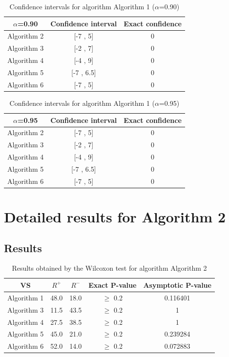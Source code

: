 \documentclass[a4paper,10pt]{article}
\begin{document}
\begin{table}[!htp]
\centering\small
\begin{tabular}{
|c|c|c|}
\hline
 $\alpha$=0.90 & Confidence interval & Exact confidence \\ \hline 
Algorithm 2 & [-7 , 5] & 0\\ \hline 
Algorithm 3 & [-2 , 7] & 0\\ \hline 
Algorithm 4 & [-4 , 9] & 0\\ \hline 
Algorithm 5 & [-7 , 6.5] & 0\\ \hline 
Algorithm 6 & [-7 , 5] & 0\\ \hline 

\end{tabular}
\caption{Confidence intervals for algorithm Algorithm 1 ($\alpha$=0.90)}
\end{table}
\begin{table}[!htp]
\centering\small
\begin{tabular}{
|c|c|c|}
\hline
 $\alpha$=0.95 & Confidence interval & Exact confidence \\ \hline 
Algorithm 2 & [-7 , 5] & 0\\ \hline 
Algorithm 3 & [-2 , 7] & 0\\ \hline 
Algorithm 4 & [-4 , 9] & 0\\ \hline 
Algorithm 5 & [-7 , 6.5] & 0\\ \hline 
Algorithm 6 & [-7 , 5] & 0\\ \hline 

\end{tabular}
\caption{Confidence intervals for algorithm Algorithm 1 ($\alpha$=0.95)}
\end{table}

 \clearpage 


\section{Detailed results for Algorithm 2}


\subsection{Results}

\begin{table}[!htp]
\centering\small
\begin{tabular}{
|c|c|c|c|c|}
\hline
 VS & $R^{+}$ & $R^{-}$ & Exact P-value & Asymptotic P-value \\ \hline 
Algorithm 1 & 48.0 & 18.0 & $\geq$ 0.2 & 0.116401\\ \hline 
Algorithm 3 & 11.5 & 43.5 & $\geq$ 0.2 & 1\\ \hline 
Algorithm 4 & 27.5 & 38.5 & $\geq$ 0.2 & 1\\ \hline 
Algorithm 5 & 45.0 & 21.0 & $\geq$ 0.2 & 0.239284\\ \hline 
Algorithm 6 & 52.0 & 14.0 & $\geq$ 0.2 & 0.072883\\ \hline 

\end{tabular}
\caption{Results obtained by the Wilcoxon test for algorithm Algorithm 2}
\end{table}
\end{document}
